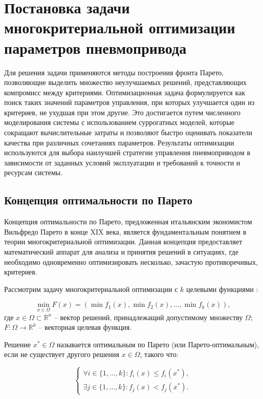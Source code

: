 \section{Постановка задачи многокритериальной оптимизации параметров пневмопривода}\label{ch:ch4/sec2}

Для решения задачи применяются методы построения фронта Парето,
позволяющие выделить множество неулучшаемых решений, представляющих
компромисс между критериями. Оптимизационная задача формулируется как
поиск таких значений параметров управления, при которых улучшается
один из критериев, не ухудшая при этом другие. Это достигается путем
численного моделирования системы с использованием суррогатных моделей,
которые сокращают вычислительные затраты и позволяют быстро оценивать
показатели качества при различных сочетаниях параметров. Результаты
оптимизации используются для выбора наилучшей стратегии управления
пневмоприводом в зависимости от заданных условий эксплуатации и
требований к точности и ресурсам системы.

\subsection{Концепция оптимальности по Парето}\label{ch:ch4/sec2/subsec1}

Концепция оптимальности по Парето, предложенная итальянским экономистом
Вильфредо Парето \cite*{pareto1896cours} в конце XIX века, является фундаментальным понятием в теории
многокритериальной оптимизации. Данная концепция предоставляет математический аппарат для
анализа и принятия решений \cite*{miettinen1999nonlinear} в ситуациях, где необходимо одновременно оптимизировать несколько,
зачастую противоречивых, критериев.

Рассмотрим задачу многокритериальной оптимизации с $k$ целевыми функциями \cite*{deb2001multi}:

\begin{equation}
    \label{eq:multiobjective_optimization}
    \min_{x \in \Omega} F(x) = (\min f_1(x), \min f_2(x), \ldots, \min f_k(x)),
\end{equation}
где $x \in \Omega \subset \mathbb{R}^n$ -- вектор решений, принадлежащий допустимому множеству $\Omega$;
$F: \Omega \rightarrow \mathbb{R}^k$ -- векторная целевая функция.

Решение $x^* \in \Omega$ называется оптимальным по Парето
(или Парето-оптимальным), если не существует другого решения $x \in \Omega$, такого что:

\begin{equation}
    \begin{cases}
        \forall i \in \{1, \ldots, k\}: f_i(x) \leq f_i(x^*), \\
        \exists j \in \{1, \ldots, k\}: f_j(x) < f_j(x^*).
    \end{cases}
\end{equation}

